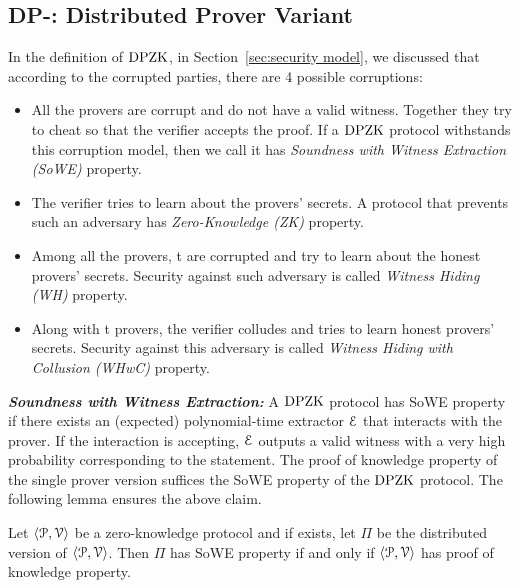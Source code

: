 
\subsection{DP-\name: Distributed Prover Variant}
\label{subsec:DPgraphene}

In the definition of $\text{DPZK}$, in Section~\ref{sec:security model}, we discussed that according to the corrupted parties, there are 4 possible corruptions:
\begin{itemize}
	\item All the provers are corrupt and do not have a valid witness. Together they try to cheat so that the verifier accepts the proof. If a $\text{DPZK}$ protocol withstands this corruption model, then we call it has {\em Soundness with Witness Extraction (SoWE)} property.
	\item The verifier tries to learn about the provers' secrets. A protocol that prevents such an adversary has {\em Zero-Knowledge (ZK)} property.
	\item Among all the provers, t are corrupted and try to learn about the honest provers' secrets. Security against such adversary is called {\em Witness Hiding (WH)} property.
	\item Along with t provers, the verifier colludes and tries to learn honest provers' secrets. Security against this adversary is called {\em Witness Hiding with Collusion (WHwC)} property.
\end{itemize}
\noindent\textit{\textbf{Soundness with Witness Extraction:}} A $\text{DPZK}$ protocol has {SoWE} property if there exists an (expected) polynomial-time extractor $\mathcal{E}$ that interacts with the prover. If the interaction is accepting, $\mathcal{E}$ outputs a valid witness with a very high probability corresponding to the statement. 
The proof of knowledge property of the single prover version suffices the {SoWE} property of the $\text{DPZK}$ protocol. The following lemma ensures the above claim.
\begin{lemma}\label{lem:SoWE}
	Let $\langle \mathcal{P},\mathcal{V}\rangle$ be a zero-knowledge protocol and if exists, let $\Pi$ be the distributed version of $\langle \mathcal{P},\mathcal{V}\rangle$. Then $\Pi$ has SoWE property if and only if $\langle \mathcal{P},\mathcal{V}\rangle$ has proof of knowledge property.
\end{lemma} 
